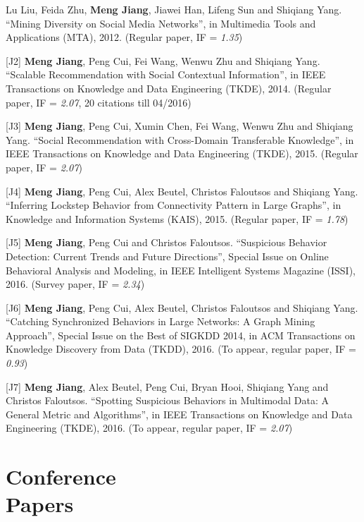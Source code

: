 \documentclass[margin, 10pt]{res} %
\begin{document}
\begin{resume}
[J1] Lu Liu, Feida Zhu, {\bf Meng Jiang}, Jiawei Han, Lifeng Sun and Shiqiang Yang. ``Mining Diversity on Social Media Networks'', in Multimedia Tools and Applications (MTA), 2012. (Regular paper, IF = {\em 1.35})

[J2] {\bf Meng Jiang}, Peng Cui, Fei Wang, Wenwu Zhu and Shiqiang Yang. ``Scalable Recommendation with Social Contextual Information'', in IEEE Transactions on Knowledge and Data Engineering (TKDE), 2014. (Regular paper, IF = {\em 2.07}, 20 citations till 04/2016)

[J3] {\bf Meng Jiang}, Peng Cui, Xumin Chen, Fei Wang, Wenwu Zhu and Shiqiang Yang. ``Social Recommendation with Cross-Domain Transferable Knowledge'', in IEEE Transactions on Knowledge and Data Engineering (TKDE), 2015. (Regular paper, IF = {\em 2.07})

[J4] {\bf Meng Jiang}, Peng Cui, Alex Beutel, Christos Faloutsos and Shiqiang Yang. ``Inferring Lockstep Behavior from Connectivity Pattern in Large Graphs'', in Knowledge and Information Systems (KAIS), 2015. (Regular paper, IF = {\em 1.78})

[J5] {\bf Meng Jiang}, Peng Cui and Christos Faloutsos. ``Suspicious Behavior Detection: Current Trends and Future Directions'', Special Issue on Online Behavioral Analysis and Modeling, in IEEE Intelligent Systems Magazine (ISSI), 2016. (Survey paper, IF = {\em 2.34})

[J6] {\bf Meng Jiang}, Peng Cui, Alex Beutel, Christos Faloutsos and Shiqiang Yang. ``Catching Synchronized Behaviors in Large Networks: A Graph Mining Approach'', Special Issue on the Best of SIGKDD 2014, in ACM Transactions on Knowledge Discovery from Data (TKDD), 2016. (To appear, regular paper, IF = {\em 0.93})

[J7] {\bf Meng Jiang}, Alex Beutel, Peng Cui, Bryan Hooi, Shiqiang Yang and Christos Faloutsos. ``Spotting Suspicious Behaviors in Multimodal Data: A General Metric and Algorithms'', in IEEE Transactions on Knowledge and Data Engineering (TKDE), 2016. (To appear, regular paper, IF = {\em 2.07})


\section{Conference \\ Papers}


\end{resume}
\end{document}
